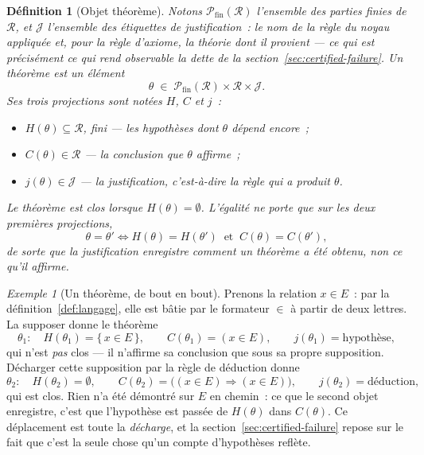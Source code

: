 \documentclass[11pt]{article}
\newtheorem{definition}{Définition}
\theoremstyle{remark}\newtheorem{example}{Exemple}
\begin{document}
\begin{definition}[Objet théorème]\label{def:theoreme}
Notons $\mathcal{P}_{\mathrm{fin}}(\mathcal{R})$ l'ensemble des parties finies de
$\mathcal{R}$, et $\mathcal{J}$ l'ensemble des étiquettes de justification~: le nom de
la règle du noyau appliquée et, pour la règle d'axiome, la théorie dont il provient
--- ce qui est précisément ce qui rend observable la dette de la
section~\ref{sec:certified-failure}. Un \emph{théorème} est un élément
\[ \theta \;\in\; \mathcal{P}_{\mathrm{fin}}(\mathcal{R}) \times
   \mathcal{R} \times \mathcal{J} . \]
Ses trois projections sont notées $H$, $C$ et $j$~:
\begin{itemize}\itemsep2pt
  \item $H(\theta) \subseteq \mathcal{R}$, fini --- les \emph{hypothèses} dont
        $\theta$ dépend encore~;
  \item $C(\theta) \in \mathcal{R}$ --- la \emph{conclusion} que $\theta$ affirme~;
  \item $j(\theta) \in \mathcal{J}$ --- la \emph{justification}, c'est-à-dire la
        règle qui a produit $\theta$.
\end{itemize}
Le théorème est \emph{clos} lorsque
$H(\theta) = \emptyset$. L'égalité ne porte que sur les deux premières projections,
\[ \theta = \theta' \iff H(\theta) = H(\theta') \ \text{ et } \ C(\theta) = C(\theta') , \]
de sorte que la justification enregistre \emph{comment} un théorème a été obtenu, non
ce qu'il affirme.
\end{definition}


\begin{example}[Un théorème, de bout en bout]
Prenons la relation $x \in E$~: par la définition~\ref{def:langage}, elle est bâtie
par le formateur $\in$ à partir de deux lettres. La supposer donne le théorème
\[ \theta_1 : \quad H(\theta_1) = \{\, x \in E \,\}, \qquad
   C(\theta_1) = (x \in E), \qquad j(\theta_1) = \text{hypothèse}, \]
qui n'est \emph{pas} clos --- il n'affirme sa conclusion que sous sa propre
supposition. Décharger cette supposition par la règle de déduction donne
\[ \theta_2 : \quad H(\theta_2) = \emptyset, \qquad
   C(\theta_2) = \bigl((x \in E) \Rightarrow (x \in E)\bigr), \qquad
   j(\theta_2) = \text{déduction}, \]
qui est clos. Rien n'a été démontré sur $E$ en chemin~: ce que le second objet
enregistre, c'est que l'hypothèse est passée de $H(\theta)$ dans $C(\theta)$. Ce déplacement est toute la \emph{décharge}, et la
section~\ref{sec:certified-failure} repose sur le fait que c'est la seule chose qu'un
compte d'hypothèses reflète.
\end{example}
\end{document}

